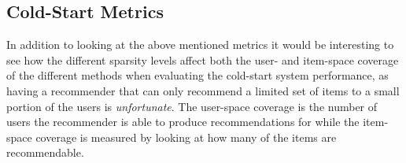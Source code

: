 %
%
%

\subsection{Cold-Start Metrics}

In addition to looking at the above mentioned metrics it would be interesting to see how
the different sparsity levels affect both the user- and item-space coverage of the different
methods when evaluating the cold-start system performance, as having a recommender that can only
recommend a limited set of items to a small portion of the users is \emph{unfortunate}. The
user-space coverage is the number of users the recommender is able to produce recommendations for while the item-space
coverage is measured by looking at how many of the items are recommendable.
